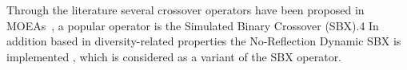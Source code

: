 Through the literature several crossover operators have been proposed in MOEAs~\cite{Joel:ParentMeanCentricSelfAdaptation},  
a popular operator is the Simulated Binary Crossover (SBX).4\cite{Joel:SBX1994}%
%	
In addition based in diversity-related properties the No-Reflection Dynamic SBX is implemented \cite{Joel:DNR_SBX}, which is considered as a variant of the SBX operator.



